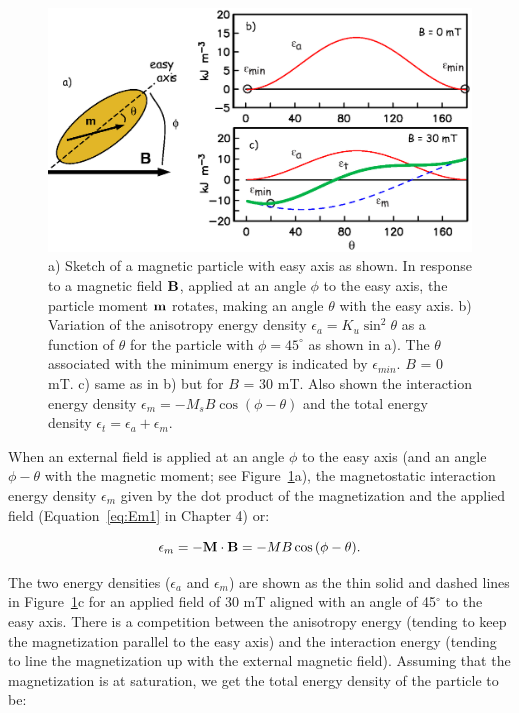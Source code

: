 \begin{figure}[h!tb]
\centering  \includegraphics[width=14 cm]{EPSfiles/mB.eps}
\caption{a) Sketch of a magnetic particle with easy axis as shown.  In
response to a magnetic field $\hbox{\bf B}$, applied at an angle $\phi$ to the easy axis, the
particle moment $\hbox{\bf m}$ rotates, making an angle
$\theta$ with the easy axis. b) Variation of the anisotropy energy density  $\epsilon_a = K_u\sin^2\theta$ as a function of $\theta$ for the particle with $\phi=45^{\circ}$ as  shown in a). The $\theta$ associated with the minimum energy is indicated by $\epsilon_{min}$.  $B$ = 0 mT.  c) same as in b)  but for $B$ = 30 mT.  Also shown  the interaction energy density  $\epsilon_m=-M_s B\cos (\phi-\theta)$ and the total energy density $\epsilon_t=\epsilon_a+\epsilon_m$.}
\label{fig:mB}
\end{figure}



When an external field is applied at an angle $\phi$ to the easy axis (and an angle $\phi-\theta$ with the magnetic moment; see Figure~\ref{fig:mB}a), the magnetostatic  interaction energy  density $\epsilon_m$  given by the dot product of the magnetization and the applied field (Equation~\ref{eq:Em1}  in Chapter 4) or: 

  $$
\epsilon_m = -\hbox{\bf M} \cdot \hbox{\bf B} = -MB \,\hbox{cos}\,(\phi-\theta).
 $$
 
 \noindent
The two energy densities  ($\epsilon_a$ and $\epsilon_m$) are shown as the thin solid and dashed lines  in Figure~\ref{fig:mB}c for an applied field of 30 mT aligned with an angle of 45$^{\circ}$ to the easy axis.   
There is a 
 competition between the anisotropy energy (tending to keep the magnetization parallel to the easy axis) and the interaction energy (tending to line the magnetization up with the external magnetic field).   Assuming that the magnetization is at saturation, we get the total energy density of the particle to be: 

